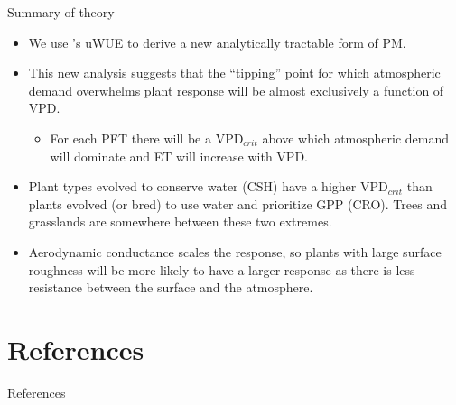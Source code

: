 \documentclass{beamer}
\begin{document}
\begin{frame}{Summary of theory}
  \begin{itemize}
  \item We use \cite{Zhou_2016}'s uWUE to derive a new analytically tractable form of PM.
  \item This new analysis suggests that the ``tipping'' point for which atmospheric demand overwhelms plant response will be almost exclusively a function of VPD.
    \begin{itemize}
    \item For each PFT there will be a VPD$_{crit}$ above which atmospheric demand will dominate and ET will increase with VPD.
    \end{itemize}
  \item Plant types evolved to conserve water (CSH) have a higher VPD$_{crit}$ than plants evolved (or bred) to use water and prioritize GPP (CRO). Trees and grasslands are somewhere between these two extremes.
  \item Aerodynamic conductance scales the response, so plants with large surface roughness will be more likely to have a larger response as there is less resistance between the surface and the atmosphere.
  \end{itemize}
\end{frame}

\section{References}
\begin{frame}{References}
  \AtNextBibliography{\small}
  \printbibliography
\end{frame}


\end{document}
